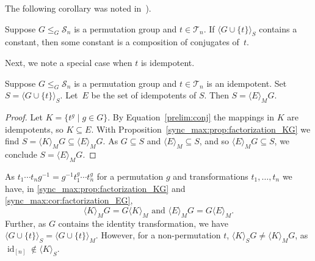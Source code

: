 The following corollary was noted in~\cite[Sec.~2]{DBLP:journals/tcs/AraujoBC13}).

\begin{corollary}
	Suppose $G \le_G \mathcal S_n$ is a permutation group and $t \in \mathcal T_n$.
	If $\langle G \cup \{t\} \rangle_S$
	contains a constant, then some constant %
	is a composition of conjugates of~$t$.
\end{corollary}

Next, we note a special case when $t$ is idempotent.

\begin{corollary}
	\label{sync_max:cor:factorization_EG}
	Suppose $G \le_G \mathcal S_n$ is a permutation group and $t \in \mathcal T_n$ is an idempotent.
	Set $S = \langle G \cup \{t\} \rangle_S$. Let~$E$ be the set of idempotents of $S$.
	Then
	$S = \langle E \rangle_M G$.	
\end{corollary}
\begin{proof}
	Let $K = \{ t^g \mid g \in G\}$.
	By Equation~\eqref{prelim:conj} the mappings in $K$ are idempotents,
	so $K \subseteq E$.
	With Proposition~\ref{sync_max:prop:factorization_KG} 
	we find $S = \langle K \rangle_M G \subseteq \langle E \rangle_M G$.
	As $G \subseteq S$ and $\langle E \rangle_M \subseteq S$,
	and so $\langle E \rangle_M G \subseteq S$,
	we conclude $S = \langle E \rangle_M G$.	
\end{proof} 

As $t_1 \cdots t_n g^{-1} = g^{-1} t_1^g \cdots t_n^g$ for a permutation  $g$ and transformations $t_1, \ldots, t_n$  we have,
in \cref{sync_max:prop:factorization_KG} and \cref{sync_max:cor:factorization_EG},
\[ 
\langle K \rangle_M G = G \langle K \rangle_M \text{ and }
\langle E \rangle_M G = G \langle E \rangle_M.
\]
Further, as $G$ contains the identity transformation, we have
$\langle G \cup \{t\} \rangle_S = \langle G \cup \{t\} \rangle_M$.
However, for a non-permutation $t$, $\langle K \rangle_S G \ne \langle K \rangle_M G$,
as $\operatorname{id}_{[n]} \notin \langle K \rangle_S$.